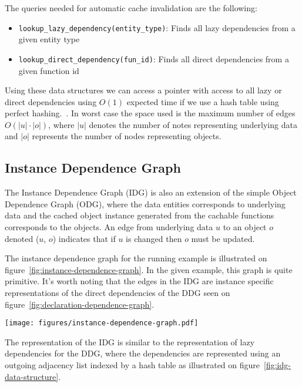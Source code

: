 The queries needed for automatic cache invalidation are the following:

\begin{itemize}
  \item \verb$lookup_lazy_dependency(entity_type)$: Finds all lazy dependencies from a given entity type
  \item \verb$lookup_direct_dependency(fun_id)$: Finds all direct dependencies from a given function id
\end{itemize}

Using these data structures we can access a pointer with access to all lazy or direct dependencies using $O(1)$ expected time if we use a hash table using perfect hashing.~\cite{paper:perfect-hashing}. In worst case the space used is the maximum number of edges $O(|u| \cdot |o|)$, where $|u|$ denotes the number of notes representing underlying data and $|o|$ represents the number of nodes representing objects.


\subsection{Instance Dependence Graph}
\label{subsec:instance-dependence-graph}

The Instance Dependence Graph (IDG) is also an extension of the simple Object Dependence Graph (ODG), where the data entities corresponds to underlying data and the cached object instance generated from the cachable functions corresponds to the objects. An edge from underlying data $u$ to an object $o$ denoted ($u$, $o$) indicates that if $u$ is changed then $o$ must be updated.

The instance dependence graph for the running example is illustrated on figure~\ref{fig:instance-dependence-graph}. In the given example, this graph is quite primitive. It's worth noting that the edges in the IDG are instance specific representations of the direct dependencies of the DDG seen on figure~\ref{fig:declaration-dependence-graph}.

\begin{figure*}[ht!]
  \centering
  \texttt{[image: figures/instance-dependence-graph.pdf]}
  \caption{An example of an Instance Dependence Graph based on the running example}
  \label{fig:instance-dependence-graph}
\end{figure*}

The representation of the IDG is similar to the representation of lazy dependencies for the DDG, where the dependencies are represented using an outgoing adjacency list indexed by a hash table as illustrated on figure~\ref{fig:idg-data-structure}.

